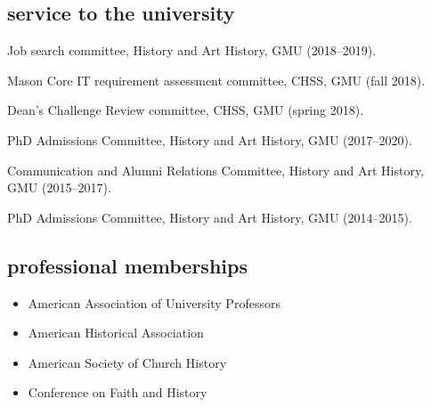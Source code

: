 \documentclass[11pt]{article}
\providecommand{\tightlist}{%
  \setlength{\itemsep}{0pt}\setlength{\parskip}{0pt}}
\begin{document}

\subsection{service to the university}\label{service-university}

Job search committee, History and Art History, GMU (2018--2019).

Mason Core IT requirement assessment committee, CHSS, GMU (fall 2018).

Dean's Challenge Review committee, CHSS, GMU (spring 2018).

PhD Admissions Committee, History and Art History, GMU (2017--2020).

Communication and Alumni Relations Committee, History and Art History, GMU 
(2015--2017).

PhD Admissions Committee, History and Art History, GMU (2014--2015).






\subsection{professional memberships}\label{professional-memberships}

\begin{itemize}
    \tightlist
    \item American Association of University Professors
    \item American Historical Association
    \item American Society of Church History
    \item Conference on Faith and History
\end{itemize}
\end{document}

